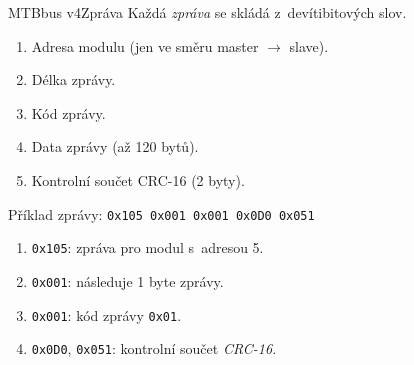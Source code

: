 \documentclass[aspectratio=169]{beamer}
\begin{document}
\begin{frame}{MTBbus v4}{Zpráva}
Každá \textit{zpráva} se skládá z devítibitových slov.
\begin{enumerate}
\item Adresa modulu (jen ve směru master $\rightarrow$ slave).
\item Délka zprávy.
\item Kód zprávy.
\item Data zprávy (až 120 bytů).
\item Kontrolní součet CRC-16 (2 byty).
\end{enumerate}

\begin{exampleblock}{Příklad zprávy: \texttt{0x105 0x001 0x001 0x0D0 0x051}}
\begin{enumerate}
\item \texttt{0x105}: zpráva pro modul s~adresou 5.
\item \texttt{0x001}: následuje 1 byte zprávy.
\item \texttt{0x001}: kód zprávy \texttt{0x01}.
\item \texttt{0x0D0}, \texttt{0x051}: kontrolní součet \textit{CRC-16}.
\end{enumerate}
\end{exampleblock}
\end{frame}

\end{document}
